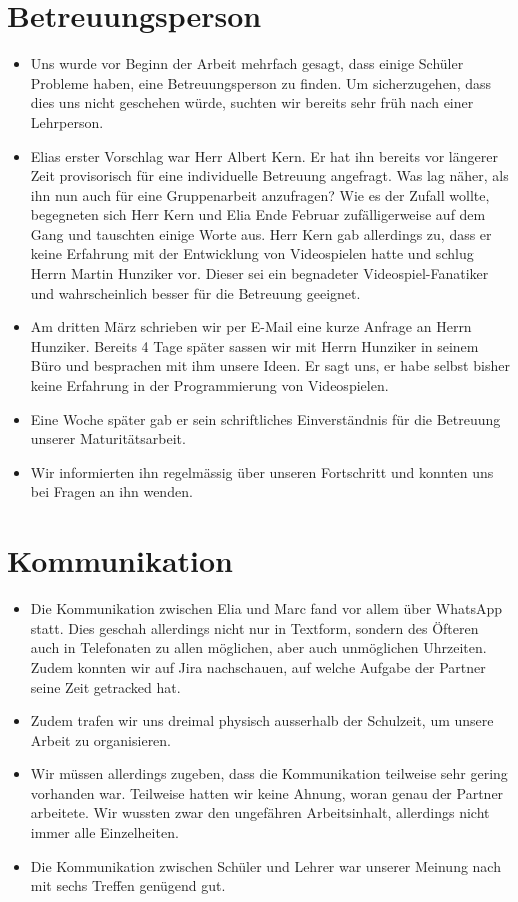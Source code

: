 \section{Betreuungsperson}
\begin{itemize}
    \item Uns wurde vor Beginn der Arbeit mehrfach gesagt, dass einige Schüler Probleme haben, eine Betreuungsperson zu finden. Um sicherzugehen, dass dies uns nicht geschehen würde, suchten wir bereits sehr früh nach einer Lehrperson.
    \item Elias erster Vorschlag war Herr Albert Kern. Er hat ihn bereits vor längerer Zeit provisorisch für eine individuelle Betreuung angefragt. Was lag näher, als ihn nun auch für eine Gruppenarbeit anzufragen? Wie es der Zufall wollte, begegneten sich 
    Herr Kern und Elia Ende Februar zufälligerweise auf dem Gang und tauschten einige Worte aus. Herr Kern gab allerdings zu, dass er keine Erfahrung mit der Entwicklung von Videospielen hatte und schlug Herrn Martin Hunziker vor.
    Dieser sei ein begnadeter Videospiel-Fanatiker und wahrscheinlich besser für die Betreuung geeignet. 
    \item Am dritten März schrieben wir per E-Mail eine kurze Anfrage an Herrn Hunziker. 
    Bereits 4 Tage später sassen wir mit Herrn Hunziker in seinem Büro und besprachen mit ihm unsere Ideen. Er sagt uns, er habe selbst bisher keine Erfahrung in der Programmierung von Videospielen.
    \item Eine Woche später gab er sein schriftliches Einverständnis für die Betreuung unserer Maturitätsarbeit. 
    \item Wir informierten ihn regelmässig über unseren Fortschritt und konnten uns bei Fragen an ihn wenden.
\end{itemize}

\section{Kommunikation}
\begin{itemize}
    \item Die Kommunikation zwischen Elia und Marc fand vor allem über WhatsApp statt. Dies geschah allerdings nicht nur in Textform, sondern des Öfteren auch in Telefonaten zu allen möglichen, aber auch unmöglichen Uhrzeiten. Zudem konnten wir auf Jira nachschauen, auf welche Aufgabe der Partner
    seine Zeit getracked hat. 
    \item Zudem trafen wir uns dreimal physisch ausserhalb der Schulzeit, um unsere Arbeit zu organisieren.
    \item Wir müssen allerdings zugeben, dass die Kommunikation teilweise sehr gering vorhanden war. Teilweise hatten wir keine Ahnung, woran genau der Partner arbeitete. Wir wussten zwar den ungefähren Arbeitsinhalt, allerdings nicht immer alle Einzelheiten.
    \item Die Kommunikation zwischen Schüler und Lehrer war unserer Meinung nach mit sechs Treffen genügend gut.
\end{itemize}



